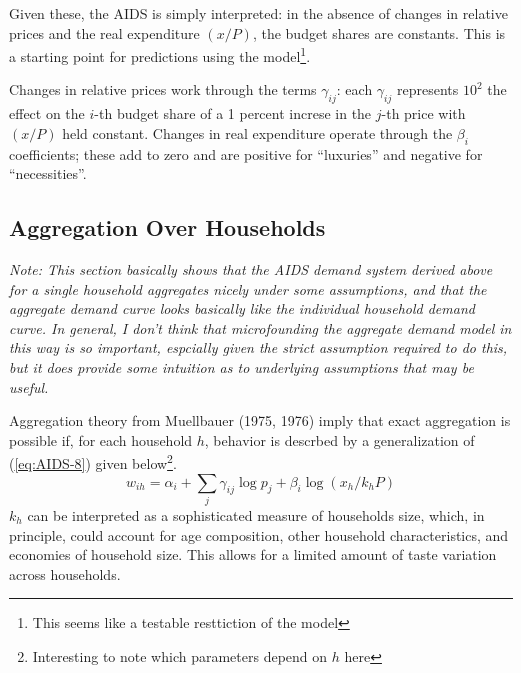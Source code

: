 Given these, the AIDS is simply interpreted: in the absence of changes in relative prices and the real expenditure $(x/P)$, the budget shares are constants. This is a starting point for predictions using the model\footnote{This seems like a testable resttiction of the model}. 

 Changes in relative prices work through the terms $\gamma_{ij}$: each \(\gamma_{ij}\) represents $10^2$ the effect on the $i$-th budget share of a 1 percent increse in the $j$-th price with \((x/P)\) held constant. Changes in real expenditure operate through the $\beta_i$ coefficients; these add to zero and are positive for ``luxuries'' and negative for ``necessities''.

\subsection{Aggregation Over Households}

\emph{Note: This section basically shows that the AIDS demand system derived above for a single household aggregates nicely under some assumptions, and that the aggregate demand curve looks basically like the individual household demand curve. In general, I don't think that microfounding the aggregate demand model in this way is so important, espcially given the strict assumption required to do this, but it does provide some intuition as to underlying assumptions that may be useful.}

Aggregation theory from Muellbauer (1975, 1976) imply that exact aggregation is possible if, for each household $h$, behavior is descrbed by a generalization of (\ref{eq:AIDS-8}) given below\footnote{Interesting to note which parameters depend on $h$ here}.
\begin{equation}
	\label{eq:AIDS-8'}
	w_{ih} = \alpha_i + \sum_j \gamma_{ij} \log p_j + \beta_i \log(x_h/k_h P)
\end{equation}
$k_h$ can be interpreted as a sophisticated measure of households size, which, in principle, could account for age composition, other household characteristics, and economies of household size. This allows for a limited amount of taste variation across households. 

